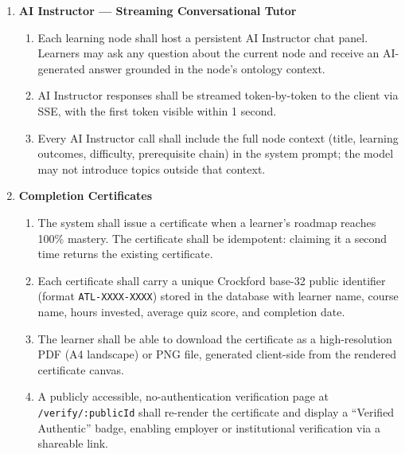 \begin{enumerate}
    \item[\textbf{FR9:}] \textbf{AI Instructor --- Streaming Conversational Tutor}
        \begin{enumerate}
            \item[\textbf{FR9.1:}] Each learning node shall host a persistent AI Instructor chat panel. Learners may ask any question about the current node and receive an AI-generated answer grounded in the node's ontology context.
            \item[\textbf{FR9.2:}] AI Instructor responses shall be streamed token-by-token to the client via SSE, with the first token visible within 1 second.
            \item[\textbf{FR9.3:}] Every AI Instructor call shall include the full node context (title, learning outcomes, difficulty, prerequisite chain) in the system prompt; the model may not introduce topics outside that context.
        \end{enumerate}

    \item[\textbf{FR10:}] \textbf{Completion Certificates}
        \begin{enumerate}
            \item[\textbf{FR10.1:}] The system shall issue a certificate when a learner's roadmap reaches 100\% mastery. The certificate shall be idempotent: claiming it a second time returns the existing certificate.
            \item[\textbf{FR10.2:}] Each certificate shall carry a unique Crockford base-32 public identifier (format \texttt{ATL-XXXX-XXXX}) stored in the database with learner name, course name, hours invested, average quiz score, and completion date.
            \item[\textbf{FR10.3:}] The learner shall be able to download the certificate as a high-resolution PDF (A4 landscape) or PNG file, generated client-side from the rendered certificate canvas.
            \item[\textbf{FR10.4:}] A publicly accessible, no-authentication verification page at \texttt{/verify/:publicId} shall re-render the certificate and display a ``Verified Authentic'' badge, enabling employer or institutional verification via a shareable link.
        \end{enumerate}


\end{enumerate}
